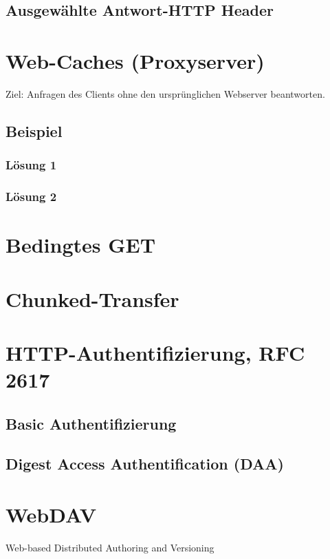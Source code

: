 \subsection{Ausgewählte Antwort-HTTP Header}
\section{Web-Caches (Proxyserver)}
Ziel: Anfragen des Clients ohne den ursprünglichen Webserver beantworten.
\subsection{Beispiel}
\subsubsection{Lösung 1}
\subsubsection{Lösung 2}
\section{Bedingtes GET}
\section{Chunked-Transfer}
\section{HTTP-Authentifizierung, RFC 2617}
\subsection{Basic Authentifizierung}
\subsection{Digest Access Authentification (DAA)}
\section{WebDAV}
Web-based Distributed Authoring and Versioning

